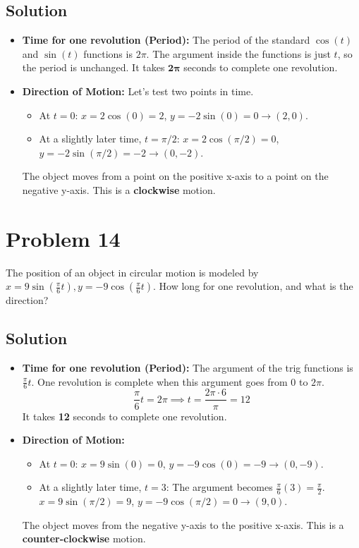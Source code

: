 \documentclass{article}
\begin{document}
\subsection*{Solution}
\begin{itemize}
    \item \textbf{Time for one revolution (Period):} The period of the standard $\cos(t)$ and $\sin(t)$ functions is $2\pi$. The argument inside the functions is just $t$, so the period is unchanged. It takes $\boldsymbol{2\pi}$ seconds to complete one revolution.

    \item \textbf{Direction of Motion:}
    Let's test two points in time.
    \begin{itemize}
        \item At $t=0$: $x = 2\cos(0)=2$, $y=-2\sin(0)=0 \rightarrow (2, 0)$.
        \item At a slightly later time, $t=\pi/2$: $x = 2\cos(\pi/2)=0$, $y=-2\sin(\pi/2)=-2 \rightarrow (0, -2)$.
    \end{itemize}
    The object moves from a point on the positive x-axis to a point on the negative y-axis. This is a \textbf{clockwise} motion.
\end{itemize}

\section{Problem 14}
The position of an object in circular motion is modeled by $x = 9 \sin(\frac{\pi}{6}t), y = -9 \cos(\frac{\pi}{6}t)$. How long for one revolution, and what is the direction?

\subsection*{Solution}
\begin{itemize}
    \item \textbf{Time for one revolution (Period):} The argument of the trig functions is $\frac{\pi}{6}t$. One revolution is complete when this argument goes from 0 to $2\pi$.
    \[ \frac{\pi}{6}t = 2\pi \implies t = \frac{2\pi \cdot 6}{\pi} = 12 \]
    It takes \textbf{12} seconds to complete one revolution.

    \item \textbf{Direction of Motion:}
    \begin{itemize}
        \item At $t=0$: $x=9\sin(0)=0$, $y=-9\cos(0)=-9 \rightarrow (0, -9)$.
        \item At a slightly later time, $t=3$: The argument becomes $\frac{\pi}{6}(3) = \frac{\pi}{2}$.
        $x=9\sin(\pi/2)=9$, $y=-9\cos(\pi/2)=0 \rightarrow (9, 0)$.
    \end{itemize}
    The object moves from the negative y-axis to the positive x-axis. This is a \textbf{counter-clockwise} motion.
\end{itemize}
\end{document}
